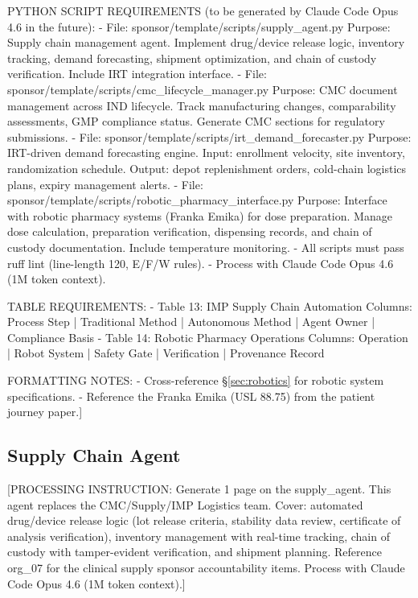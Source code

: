 PYTHON SCRIPT REQUIREMENTS (to be generated by Claude Code Opus 4.6 in the future):
- File: sponsor/template/scripts/supply\_agent.py
  Purpose: Supply chain management agent. Implement drug/device release logic,
  inventory tracking, demand forecasting, shipment optimization, and chain
  of custody verification. Include IRT integration interface.
- File: sponsor/template/scripts/cmc\_lifecycle\_manager.py
  Purpose: CMC document management across IND lifecycle. Track manufacturing
  changes, comparability assessments, GMP compliance status. Generate CMC
  sections for regulatory submissions.
- File: sponsor/template/scripts/irt\_demand\_forecaster.py
  Purpose: IRT-driven demand forecasting engine. Input: enrollment velocity,
  site inventory, randomization schedule. Output: depot replenishment orders,
  cold-chain logistics plans, expiry management alerts.
- File: sponsor/template/scripts/robotic\_pharmacy\_interface.py
  Purpose: Interface with robotic pharmacy systems (Franka Emika) for dose
  preparation. Manage dose calculation, preparation verification, dispensing
  records, and chain of custody documentation. Include temperature monitoring.
- All scripts must pass ruff lint (line-length 120, E/F/W rules).
- Process with Claude Code Opus 4.6 (1M token context).

TABLE REQUIREMENTS:
- Table 13: IMP Supply Chain Automation
  Columns: Process Step | Traditional Method | Autonomous Method | Agent Owner | Compliance Basis
- Table 14: Robotic Pharmacy Operations
  Columns: Operation | Robot System | Safety Gate | Verification | Provenance Record

FORMATTING NOTES:
- Cross-reference \S\ref{sec:robotics} for robotic system specifications.
- Reference the Franka Emika (USL 88.75) from the patient journey paper.]

\subsection{Supply Chain Agent}

[PROCESSING INSTRUCTION: Generate 1 page on the supply\_agent. This agent replaces the
CMC/Supply/IMP Logistics team. Cover: automated drug/device release logic (lot release
criteria, stability data review, certificate of analysis verification), inventory
management with real-time tracking, chain of custody with tamper-evident verification,
and shipment planning. Reference org\_07 for the clinical supply sponsor accountability
items. Process with Claude Code Opus 4.6 (1M token context).]

